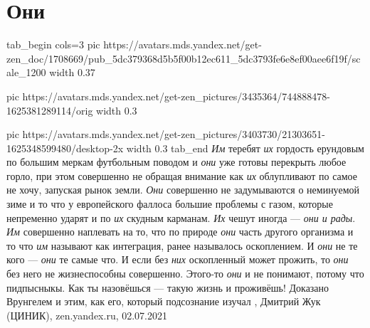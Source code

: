  
 
 
 
 
\chapter{Они}
\label{sec:slova.oni}

\ifcmt
tab_begin cols=3
	pic https://avatars.mds.yandex.net/get-zen_doc/1708669/pub_5dc379368d5b5f00b12ec611_5dc3793fe6e8ef00aee6f19f/scale_1200
	width 0.37

	pic https://avatars.mds.yandex.net/get-zen_pictures/3435364/744888478-1625381289114/orig
	width 0.3

	pic https://avatars.mds.yandex.net/get-zen_pictures/3403730/21303651-1625348599480/desktop-2x
	width 0.3
tab_end
\fi
\emph{Им} теребят \emph{их} гордость ерундовым по большим меркам футбольным поводом и \emph{они} уже
готовы перекрыть любое горло, при этом совершенно не обращая внимание как \emph{их}
облупливают по самое не хочу, запуская рынок земли. \emph{Они} совершенно не
задумываются о неминуемой зиме и то что у европейского фаллоса большие проблемы
с газом, которые непременно ударят и по \emph{их} скудным карманам. \emph{Их} чешут иногда —
\emph{они и рады}. \emph{Им} совершенно наплевать на то, что по природе \emph{они} часть другого
организма и то что \emph{им} называют как интеграция, ранее называлось оскоплением. И
\emph{они} не те кого — \emph{они} те самые что. И если без \emph{них} оскопленный может прожить, то
\emph{они} без него не жизнеспособны совершенно. Этого-то \emph{они} и не понимают, потому
что пидпысныкы. Как ты назовёшься — такую жизнь и проживёшь! Доказано Врунгелем
и этим, как его, который подсознание изучал
, Дмитрий Жук (ЦИНИК), zen.yandex.ru, 02.07.2021

